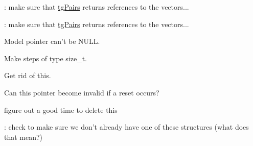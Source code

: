 \begin{DoxyRefList}
\item[\label{todo__todo000099}%
\hypertarget{todo__todo000099}{}%
Member \hyperlink{classtg_rod_info_aa16ec8cde5912ea0f91e25c9fd2e3228}{tg\-Rod\-Info\-:\-:tg\-Rod\-Info} (const \hyperlink{structtg_rod_1_1_config}{tg\-Rod\-::\-Config} \&config, const \hyperlink{classtg_pair}{tg\-Pair} \&pair)]\-: make sure that \hyperlink{classtg_pairs}{tg\-Pairs} returns references to the vectors...  
\item[\label{todo__todo000100}%
\hypertarget{todo__todo000100}{}%
Member \hyperlink{classtg_rod_info_a1988041b7d13e40f46c365bd27f68e73}{tg\-Rod\-Info\-:\-:tg\-Rod\-Info} (const \hyperlink{structtg_rod_1_1_config}{tg\-Rod\-::\-Config} \&config, \hyperlink{classtg_tags}{tg\-Tags} tags, const \hyperlink{classtg_pair}{tg\-Pair} \&pair)]\-: make sure that \hyperlink{classtg_pairs}{tg\-Pairs} returns references to the vectors...  
\item[\label{todo__todo000019}%
\hypertarget{todo__todo000019}{}%
Member \hyperlink{classtg_simulation_a23caf4331a3006bdc9df595756c0cc5c}{tg\-Simulation\-:\-:add\-Model} (\hyperlink{classtg_model}{tg\-Model} $\ast$p\-Model)]Model pointer can't be N\-U\-L\-L.  
\item[\label{todo__todo000018}%
\hypertarget{todo__todo000018}{}%
Member \hyperlink{classtg_simulation_aee97eee2bd59defdb36ef34715b8abb9}{tg\-Simulation\-:\-:run} (int steps) const ]Make steps of type size\-\_\-t.  
\item[\label{todo__todo000021}%
\hypertarget{todo__todo000021}{}%
Member \hyperlink{classtg_sim_view_ae0154bfc6695adbc59116c1455e968e9}{tg\-Sim\-View\-:\-:is\-Initialzed} () const ]Get rid of this.  
\item[\label{todo__todo000023}%
\hypertarget{todo__todo000023}{}%
Member \hyperlink{classtg_sim_view_graphics_a564f833afe40bf7763bcf682098b043e}{tg\-Sim\-View\-Graphics\-:\-:setup} ()]Can this pointer become invalid if a reset occurs?  
\item[\label{todo__todo000022}%
\hypertarget{todo__todo000022}{}%
Member \hyperlink{classtg_sim_view_graphics_aafb23490336341d08679b10a7a239a2b}{tg\-Sim\-View\-Graphics\-:\-:tg\-Sim\-View\-Graphics} (\hyperlink{classtg_world}{tg\-World} \&world, double step\-Size=1.\-0/120.0, double render\-Rate=1.\-0/60.0)]figure out a good time to delete this  
\item[\label{todo__todo000104}%
\hypertarget{todo__todo000104}{}%
Member \hyperlink{classtg_structure_a6e5d932f321fbe791c36430ec6a9f469}{tg\-Structure\-:\-:add\-Child} (\hyperlink{classtg_structure}{tg\-Structure} $\ast$child)]\-: check to make sure we don't already have one of these structures (what does that mean?)  

\end{DoxyRefList}
